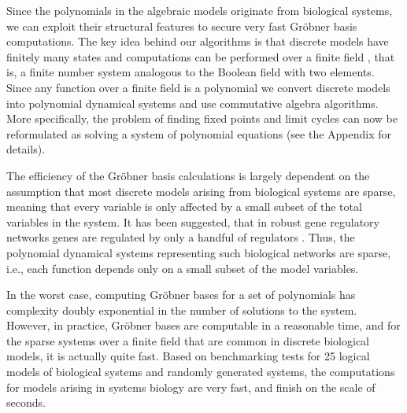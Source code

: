\documentclass[11pt]{amsart}
\begin{document}
%
%
%
 
Since the polynomials in the algebraic
models originate from biological systems, we can exploit their structural
features to secure very fast Gr\"obner basis computations.
The key idea behind our algorithms is that discrete models have finitely many states and computations
can be performed over a finite field \cite{Alan:Bioinf2010,
Hinkelmann:2010}, that is, a finite number system analogous to the Boolean field with two elements.
Since any function over a finite field is a polynomial
\cite{Lidl:1997} we convert discrete models into polynomial dynamical systems
and use commutative algebra algorithms. More specifically, the problem of finding fixed points and limit cycles
can now be reformulated as solving a system of polynomial equations (see the Appendix for details).
 
The efficiency of the Gr\"obner basis calculations is largely dependent on the
assumption that most discrete models arising from biological systems are
sparse, meaning that every variable is only affected by a small subset of the
total variables in the system. It has been suggested, that in robust gene
regulatory networks genes are regulated by only a handful of regulators
\cite{Leclerc:2008}. Thus, the polynomial dynamical systems representing such biological networks are
sparse, i.e., each function depends only on a small subset of the model variables.

In the worst case, computing Gr\"obner bases for a set of polynomials has
complexity doubly exponential in the number of solutions to the system.
However, in practice, Gr\"{o}bner bases are computable in a reasonable time, and
for the sparse systems over a finite field that are common in discrete
biological models, it is actually quite fast.
Based on benchmarking tests for
25 logical models of biological systems \cite{GINsimRepo}
and randomly generated systems,
the computations for models arising in systems biology are very fast, and finish on the scale of
seconds.
\end{document}
